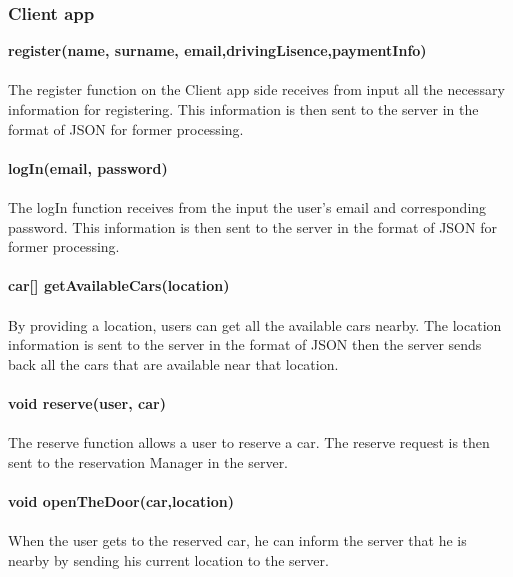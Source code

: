 \documentclass{article}
\begin{document}
	\subsubsection{Client app}
	\textbf{register(name, surname, email,drivingLisence,paymentInfo)}
	\\
	\\The register function on the Client app side receives from input all the necessary information for registering. This information is then sent to the server in the format of JSON for former processing.
	\\
	\\\textbf{logIn(email, password)}
	\\
	\\The logIn function receives from the input the user's email and corresponding password. This information is then sent to the server in the format of JSON for former processing. 
	\\
	\\\textbf{car[] getAvailableCars(location)}
	\\
	\\By providing a location, users can get all the available cars nearby. The location information is sent to the server in the format of JSON then the server sends back all the cars that are available near that location. 
	\\
	\\\textbf{void reserve(user, car)}
	\\
	\\The reserve function allows a user to reserve a car. The reserve request is then sent to the reservation Manager in the server.
	\\
	\\\textbf{void openTheDoor(car,location)}
	\\
	\\When the user gets to the reserved car, he can inform the server that he is nearby by sending his current location to the server. 
	
\end{document}
